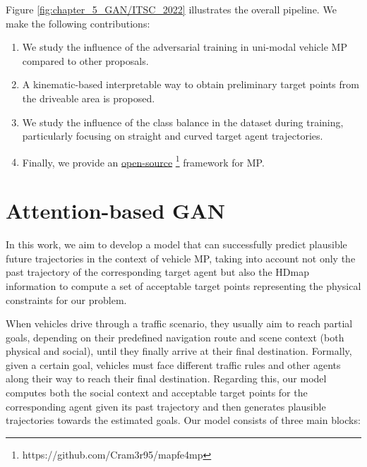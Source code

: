 Figure \ref{fig:chapter_5_GAN/ITSC_2022} illustrates the overall pipeline. We make the following contributions:

\begin{enumerate}
	
	\item We study the influence of the adversarial training in uni-modal vehicle \ac{MP} compared to other proposals. 
	
	\item A kinematic-based interpretable way to obtain preliminary target points from the driveable area is proposed.
	\item We study the influence of the class balance in the dataset during training, particularly focusing on straight and curved target agent trajectories.
	
	\item Finally, we provide an \href{https://github.com/Cram3r95/mapfe4mp}{open-source} \footnote{https://github.com/Cram3r95/mapfe4mp} framework for \ac{MP}.
	
\end{enumerate}

\section{Attention-based GAN}
\label{sec:5_attention_gan}

In this work, we aim to develop a model \cite{gomez2022exploring} that can successfully predict plausible future trajectories in the context of vehicle \ac{MP}, taking into account not only the past trajectory of the corresponding target agent but also the \ac{HDmap} information to compute a set of acceptable target points representing the physical constraints for our problem.

When vehicles drive through a traffic scenario, they usually aim to reach partial goals, depending on their predefined navigation route and scene context (both physical and social), until they finally arrive at their final destination. Formally, given a certain goal, vehicles must face different traffic rules and other agents along their way to reach their final destination. Regarding this, our model computes both the social context and acceptable target points for the corresponding agent given its past trajectory and then generates plausible trajectories towards the estimated goals. Our model consists of three main blocks:

